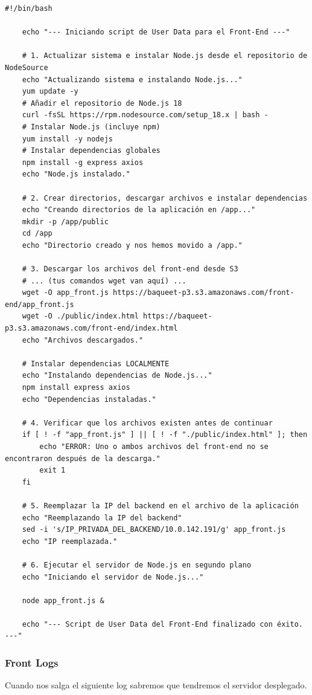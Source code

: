 \documentclass{article}
\begin{document}
	\begin{lstlisting}[style=python-style, caption= front user data sh]
	#!/bin/bash

	echo "--- Iniciando script de User Data para el Front-End ---"

	# 1. Actualizar sistema e instalar Node.js desde el repositorio de NodeSource
	echo "Actualizando sistema e instalando Node.js..."
	yum update -y
	# Añadir el repositorio de Node.js 18
	curl -fsSL https://rpm.nodesource.com/setup_18.x | bash -
	# Instalar Node.js (incluye npm)
	yum install -y nodejs
	# Instalar dependencias globales
	npm install -g express axios
	echo "Node.js instalado."

	# 2. Crear directorios, descargar archivos e instalar dependencias
	echo "Creando directorios de la aplicación en /app..."
	mkdir -p /app/public
	cd /app
	echo "Directorio creado y nos hemos movido a /app."

	# 3. Descargar los archivos del front-end desde S3
	# ... (tus comandos wget van aquí) ...
	wget -O app_front.js https://baqueet-p3.s3.amazonaws.com/front-end/app_front.js
	wget -O ./public/index.html https://baqueet-p3.s3.amazonaws.com/front-end/index.html
	echo "Archivos descargados."

	# Instalar dependencias LOCALMENTE
	echo "Instalando dependencias de Node.js..."
	npm install express axios
	echo "Dependencias instaladas."

	# 4. Verificar que los archivos existen antes de continuar
	if [ ! -f "app_front.js" ] || [ ! -f "./public/index.html" ]; then
		echo "ERROR: Uno o ambos archivos del front-end no se encontraron después de la descarga."
		exit 1
	fi

	# 5. Reemplazar la IP del backend en el archivo de la aplicación
	echo "Reemplazando la IP del backend"
	sed -i 's/IP_PRIVADA_DEL_BACKEND/10.0.142.191/g' app_front.js
	echo "IP reemplazada."

	# 6. Ejecutar el servidor de Node.js en segundo plano
	echo "Iniciando el servidor de Node.js..."

	node app_front.js &

	echo "--- Script de User Data del Front-End finalizado con éxito. ---"\end{lstlisting}
	\subsubsection{Front Logs}
	Cuando nos salga el siguiente log sabremos que tendremos el servidor desplegado.
\end{document}
